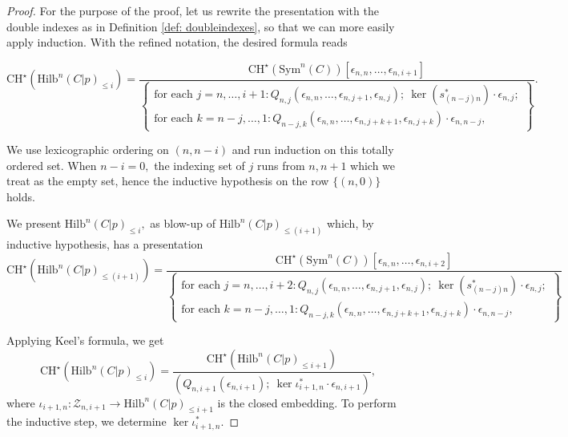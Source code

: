 \documentclass[10pt,a4paper]{amsart}
\newcommand{\CHs}{\mathrm{CH}^\star}
\newcommand{\Hilb}{\mathrm{Hilb}}
\begin{document}
\begin{proof}

For the purpose of the proof, let us rewrite the presentation with the double indexes as in Definition \ref{def: doubleindexes}, so that we can more easily apply induction. With the refined notation, the desired formula reads 

$$\mathrm{CH}^\star(\Hilb^n(C|p)_{\leq i}) = \frac{\mathrm{CH}^\star(\mathrm{Sym}^n(C))[\epsilon_{n,n},\dots, \epsilon_{n,i+1}]}{\left\{\begin{array}{c}
  \text{for each } j = n, \dots, i+1: Q_{n,j}(\epsilon_{n,n},\dots,\epsilon_{n,j+1}, \epsilon_{n,j}); \ \ker(s_{(n-j)n}^*) \cdot \epsilon_{n,j};\\ \text{for each } k = n-j, \dots, 1: Q_{n-j,k}(\epsilon_{n,n},\dots, \epsilon_{n,j+k+1}, \epsilon_{n,j+k})\cdot \epsilon_{n,n-j},  
  \end{array}\right\}}.$$

  We use lexicographic ordering on $(n, n-i)$ and run induction on this totally ordered set. When $n-i = 0,$ the indexing set of $j$ runs from $n, n+1$ which we treat as the empty set, hence the inductive hypothesis on the row $\{(n,0)\}$ holds.

  We present $\Hilb^n(C|p)_{\leq i},$ as blow-up of $\Hilb^n(C|p)_{\leq (i+1)}$ which, by inductive hypothesis, has a presentation $$\CHs(\Hilb^n(C|p)_{\leq (i+1)}) = \frac{\mathrm{CH}^\star(\mathrm{Sym}^n(C))[\epsilon_{n,n},\dots, \epsilon_{n,i+2}]}{\left\{\begin{array}{c}
  \text{for each } j = n, \dots, i+2: Q_{n,j}(\epsilon_{n,n},\dots,\epsilon_{n,j+1}, \epsilon_{n,j}); \  \ker(s_{(n-j)n}^*) \cdot \epsilon_{n,j};\\\text{for each } k = n-j, \dots, 1: Q_{n-j,k}(\epsilon_{n,n},\dots, \epsilon_{n,j+k+1}, \epsilon_{n,j+k})\cdot \epsilon_{n,n-j}, 
  \end{array}\right\}}$$ 

  Applying Keel's formula, we get \[\mathrm{CH}^\star(\Hilb^n(C|p)_{\leq i}) = \frac{\mathrm{CH}^\star(\Hilb^n(C|p)_{\leq i+1})}{(Q_{n,i+1}(\epsilon_{n,i+1}); \ \ker \iota^*_{i+1,n} \cdot \epsilon_{n,i+1})},\] where $\iota_{i+1,n}: \mathcal{Z}_{n,i+1}\to \Hilb^{n}(C|p)_{\leq i+1}$ is the closed embedding. To perform the inductive step, we determine $\ker \iota^*_{i+1,n}.$
  

\end{proof}
\end{document}
